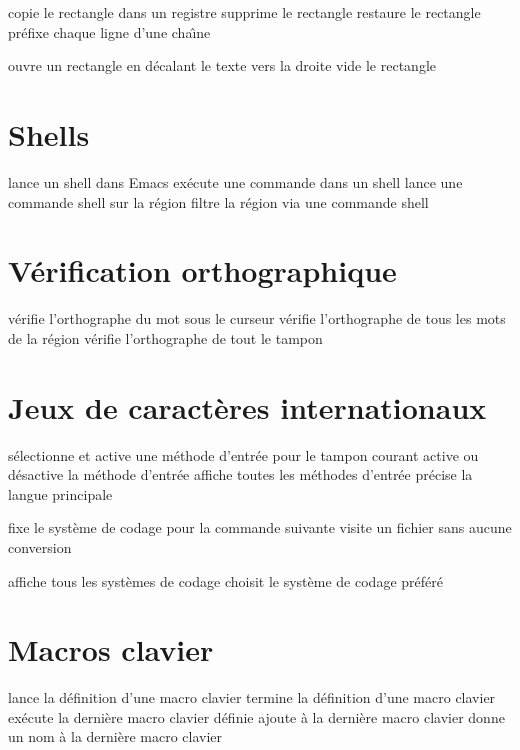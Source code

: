 copie le rectangle dans un registre
 supprime le rectangle
 restaure le rectangle
 pr\'efixe chaque ligne d'une cha\^\i{}ne

 ouvre un rectangle en d\'ecalant le texte vers la droite
 vide le rectangle

\section{Shells}

 lance un shell dans Emacs
 ex\'ecute une commande dans un shell
 lance une commande shell sur la r\'egion
 filtre la r\'egion via une commande shell

\section{V\'erification orthographique}

 v\'erifie l'orthographe du mot sous le curseur
 v\'erifie l'orthographe de tous les mots de la r\'egion
 v\'erifie l'orthographe de tout le tampon

\section{Jeux de caract\`eres internationaux}

 s\'electionne et active une m\'ethode d'entr\'ee pour le
  tampon courant
 active ou d\'esactive la m\'ethode d'entr\'ee
 affiche toutes les m\'ethodes d'entr\'ee
 pr\'ecise la langue principale

 fixe le syst\`eme de codage pour la commande suivante
 visite un fichier sans aucune conversion

 affiche tous les syst\`emes de codage
 choisit le syst\`eme de codage pr\'ef\'er\'e

\section{Macros clavier}

 lance la d\'efinition d'une macro clavier
 termine la d\'efinition d'une macro clavier
 ex\'ecute la derni\`ere macro clavier d\'efinie
 ajoute \`a la derni\`ere macro clavier
 donne un nom \`a la derni\`ere macro clavier


